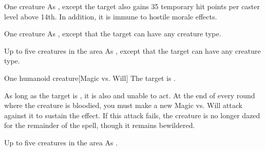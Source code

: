 \spellrng{\rngclose}
\spelldur{\durshort \dismissable}
\begin{spelltarget}{One creature}
    \spelleffect As , except the target also gains 35 temporary hit points  per caster level above 14th. In addition, it is immune to hostile morale effects.
\end{spelltarget}

\spellrng{\rngclose}
\begin{spelltarget}{One creature}
    \spellsuccess As , except that the target can have any creature type.
\end{spelltarget}

\begin{spelltargets}{Up to five creatures in the area}
    \spellsuccess As , except that the target can have any creature type.
\end{spelltargets}

\spellrng{\rngclose}
\begin{spelltarget}{One humanoid creature}[Magic vs. Will]
    \spellsuccess The target is \bewildered.

    As long as the target is \bloodied, it is also \dazed and unable to act. At the end of every round where the creature is bloodied, you must make a new Magic vs. Will attack against it to sustain the effect. If this attack fails, the creature is no longer dazed for the remainder of the spell, though it remains bewildered.
\end{spelltarget}

\begin{spelltargets}{Up to five creatures in the area}
    \spellsuccess As .
\end{spelltargets}

